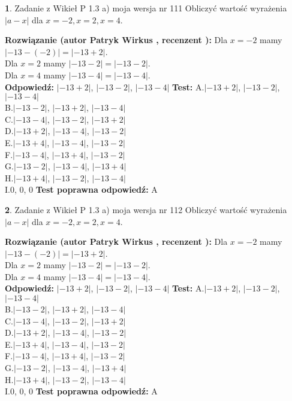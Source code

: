 \documentclass[12pt, a4paper]{article}
\theoremstyle{definition} %
\newtheorem{zad}{}
\newcommand{\zadStart}[1]{\begin{zad}#1\newline}
\newcommand{\zadStop}{\end{zad}}
\newcommand{\rozwStart}[2]{\noindent \textbf{Rozwiązanie (autor #1 , recenzent #2): }\newline}
\newcommand{\rozwStop}{\newline}
\newcommand{\odpStart}{\noindent \textbf{Odpowiedź:}\newline}
\newcommand{\odpStop}{\newline}
\newcommand{\testStart}{\noindent \textbf{Test:}\newline}
\newcommand{\testStop}{\newline}
\newcommand{\kluczStart}{\noindent \textbf{Test poprawna odpowiedź:}\newline}
\newcommand{\kluczStop}{\newline}
\begin{document}
\zadStart{Zadanie z Wikieł P 1.3 a) moja wersja nr 111}
Obliczyć wartość wyrażenia $|a - x|$ dla $x=-2,x=2,x=4$.
\zadStop
\rozwStart{Patryk Wirkus}{}
Dla $x = -2$ mamy $|-13 - (-2)| = |-13 + 2|$.\\
Dla $x = 2$ mamy $|-13 - 2| = |-13 - 2|$.\\
Dla $x = 4$ mamy $|-13 - 4| = |-13 - 4|$.\\
\rozwStop
\odpStart
$|-13 + 2|$, $|-13 - 2|$, $|-13 - 4|$
\odpStop
\testStart
A.$|-13 + 2|$, $|-13 - 2|$, $|-13 - 4|$\\
B.$|-13 - 2|$, $|-13 + 2|$, $|-13 - 4|$\\
C.$|-13 - 4|$, $|-13 - 2|$, $|-13 + 2|$\\
D.$|-13 + 2|$, $|-13 - 4|$, $|-13 - 2|$\\
E.$|-13 + 4|$, $|-13 - 4|$, $|-13 - 2|$\\
F.$|-13 - 4|$, $|-13 + 4|$, $|-13 - 2|$\\
G.$|-13 - 2|$, $|-13 - 4|$, $|-13 + 4|$\\
H.$|-13 + 4|$, $|-13 - 2|$, $|-13 - 4|$\\
I.$0$, $0$, $0$
\testStop
\kluczStart
A
\kluczStop



\zadStart{Zadanie z Wikieł P 1.3 a) moja wersja nr 112}
Obliczyć wartość wyrażenia $|a - x|$ dla $x=-2,x=2,x=4$.
\zadStop
\rozwStart{Patryk Wirkus}{}
Dla $x = -2$ mamy $|-13 - (-2)| = |-13 + 2|$.\\
Dla $x = 2$ mamy $|-13 - 2| = |-13 - 2|$.\\
Dla $x = 4$ mamy $|-13 - 4| = |-13 - 4|$.\\
\rozwStop
\odpStart
$|-13 + 2|$, $|-13 - 2|$, $|-13 - 4|$
\odpStop
\testStart
A.$|-13 + 2|$, $|-13 - 2|$, $|-13 - 4|$\\
B.$|-13 - 2|$, $|-13 + 2|$, $|-13 - 4|$\\
C.$|-13 - 4|$, $|-13 - 2|$, $|-13 + 2|$\\
D.$|-13 + 2|$, $|-13 - 4|$, $|-13 - 2|$\\
E.$|-13 + 4|$, $|-13 - 4|$, $|-13 - 2|$\\
F.$|-13 - 4|$, $|-13 + 4|$, $|-13 - 2|$\\
G.$|-13 - 2|$, $|-13 - 4|$, $|-13 + 4|$\\
H.$|-13 + 4|$, $|-13 - 2|$, $|-13 - 4|$\\
I.$0$, $0$, $0$
\testStop
\kluczStart
A
\kluczStop
\end{document}
